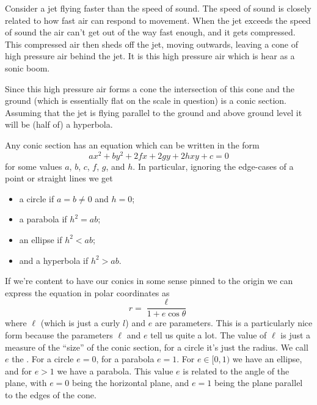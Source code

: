 \documentclass[fleqn]{LectureClass/LectureClass}
\begin{document}
    \begin{app}{}{}
        Consider a jet flying faster than the speed of sound.
        The speed of sound is closely related to how fast air can respond to movement.
        When the jet exceeds the speed of sound the air can't get out of the way fast enough, and it gets compressed.
        This compressed air then sheds off the jet, moving outwards, leaving a cone of high pressure air behind the jet.
        It is this high pressure air which is hear as a sonic boom.
        
        Since this high pressure air forms a cone the intersection of this cone and the ground (which is essentially flat on the scale in question) is a conic section.
        Assuming that the jet is flying parallel to the ground and above ground level it will be (half of) a hyperbola.
    \end{app}
    
    Any conic section has an equation which can be written in the form
    \begin{equation}
        ax^2 + by^2 + 2fx + 2gy + 2hxy + c = 0
    \end{equation}
    for some values \(a\), \(b\), \(c\), \(f\), \(g\), and \(h\).
    In particular, ignoring the edge-cases of a point or straight lines we get
    \begin{itemize}
        \item a circle if \(a = b \ne 0\) and \(h = 0\);
        \item a parabola if \(h^2 = ab\);
        \item an ellipse if \(h^2 < ab\);
        \item and a hyperbola if \(h^2 > ab\).
    \end{itemize}
    
    If we're content to have our conics in some sense pinned to the origin we can express the equation in polar coordinates as
    \begin{equation}
        r = \frac{\ell}{1 + e \cos \theta}
    \end{equation}
    where \(\ell\) (which is just a curly \(l\)) and \(e\) are parameters.
    This is a particularly nice form because the parameters \(\ell\) and \(e\) tell us quite a lot.
    The value of \(\ell\) is just a measure of the \enquote{size} of the conic section, for a circle it's just the radius.
    We call \(e\) the .
    For a circle \(e = 0\), for a parabola \(e = 1\).
    For \(e \in [0, 1)\) we have an ellipse, and for \(e > 1\) we have a parabola.
    This value \(e\) is related to the angle of the plane, with \(e = 0\) being the horizontal plane, and \(e = 1\) being the plane parallel to the edges of the cone.
    
\end{document}
